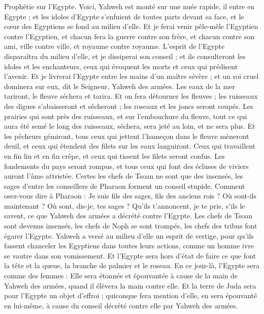 \begin{multicols}{2}
\VerseOne{}Prophétie sur l'Egypte. Voici, Yahweh est monté sur une nuée rapide, il entre en Egypte ; et les idoles d'Egypte s'enfuient de toutes parts devant sa face, et le cœur des Egyptiens se fond au milieu d'elle.
Et je ferai venir pêle-mêle l'Egyptien contre l'Egyptien, et chacun fera la guerre contre son frère, et chacun contre son ami, ville contre ville, et royaume contre royaume.
L'esprit de l'Egypte disparaîtra du milieu d'elle, et je dissiperai son conseil ; et ils consulteront les idoles et les enchanteurs, ceux qui évoquent les morts et ceux qui prédisent l'avenir.
Et je livrerai l'Egypte entre les mains d'un maître sévère ; et un roi cruel dominera sur eux, dit le Seigneur, Yahweh des armées.
Les eaux de la mer tariront, le fleuve séchera et tarira.
Et on fera détourner les fleuves ; les ruisseaux des digues s'abaisseront et sécheront ; les roseaux et les joncs seront coupés.
Les prairies qui sont près des ruisseaux, et sur l'embouchure du fleuve, tout ce qui aura été semé le long des ruisseaux, séchera, sera jeté au loin, et ne sera plus.
Et les pêcheurs gémiront, tous ceux qui jettent l'hameçon dans le fleuve mèneront deuil, et ceux qui étendent des filets sur les eaux languiront.
Ceux qui travaillent en fin lin et en fin crêpe, et ceux qui tissent les filets seront confus.
Les fondements du pays seront rompus, et tous ceux qui font des écluses de viviers auront l'âme attristée.
Certes les chefs de Tsoan ne sont que des insensés, les sages d'entre les conseillers de Pharaon forment un conseil stupide. Comment osez-vous dire à Pharaon : Je suis fils des sages, fils des anciens rois ?
Où sont-ils maintenant ? Où sont, dis-je, tes sages ? Qu'ils t'annoncent, je te prie, s'ils le savent, ce que Yahweh des armées a décrété contre l'Egypte.
Les chefs de Tsoan sont devenus insensés, les chefs de Noph se sont trompés, les chefs des tribus font égarer l'Egypte.
Yahweh a versé au milieu d'elle un esprit de vertige, pour qu'ils fassent chanceler les Egyptiens dans toutes leurs actions, comme un homme ivre se vautre dans son vomissement.
Et l'Egypte sera hors d'état de faire ce que font la tête et la queue, la branche de palmier et le roseau.
En ce jour-là, l'Egypte sera comme des femmes : Elle sera étonnée et épouvantée à cause de la main de Yahweh des armées, quand il élèvera la main contre elle.
Et la terre de Juda sera pour l'Egypte un objet d'effroi ; quiconque fera mention d'elle, en sera épouvanté en lui-même, à cause du conseil décrété contre elle par Yahweh des armées.

\end{multicols}

